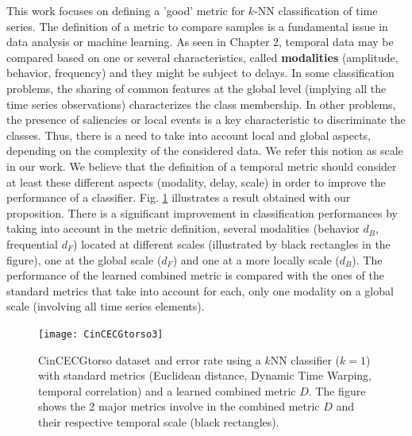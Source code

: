 This work focuses on defining a 'good' metric for $k$-NN classification of time series. The definition of a metric to compare samples is a fundamental issue in data analysis or machine learning. As seen in Chapter 2, temporal data may be compared based on one or several characteristics, called \textbf{modalities} (amplitude, behavior, frequency) and they might be subject to delays. 
In some classification problems, the sharing of common features at the global level (implying all the time series observations) characterizes the class membership. In other problems, the presence of saliencies or local events is a key characteristic to discriminate the classes. Thus, there is a need to take into account local and global aspects, depending on the complexity of the considered data. We refer this notion as scale in our work.
We believe that the definition of a temporal metric should consider at least these different aspects (modality, delay, scale) in order to improve the performance of a classifier. Fig. \ref{fig:SonyAIBO} illustrates a result obtained with our proposition. There is a significant improvement in classification performances by taking into account in the metric definition, several modalities (behavior $d_B$, frequential $d_F$) located at different scales (illustrated by black rectangles in the figure), one at the global scale ($d_F$) and one at a more locally scale ($d_B$). The performance of the learned combined metric is compared with the ones of the standard metrics that take into account for each, only one modality on a global scale (involving all time series elements).  




\begin{figure}[h!]
	\centering
	\texttt{[image: CinCECGtorso3]}
	\caption[CinCECGtorso dataset and error rate using a $k$-NN ($k=1$) with standard metrics (Euclidean distance, Dynamic Time Warping, temporal correlation) and a learned combined metric $D$.]{CinCECGtorso dataset and error rate using a $k$NN classifier ($k=1$) with standard metrics (Euclidean distance, Dynamic Time Warping, temporal correlation) and a learned combined metric $D$. The figure shows the 2 major metrics involve in the combined metric $D$ and their respective temporal scale (black rectangles).}
	\label{fig:SonyAIBO}
\end{figure}

